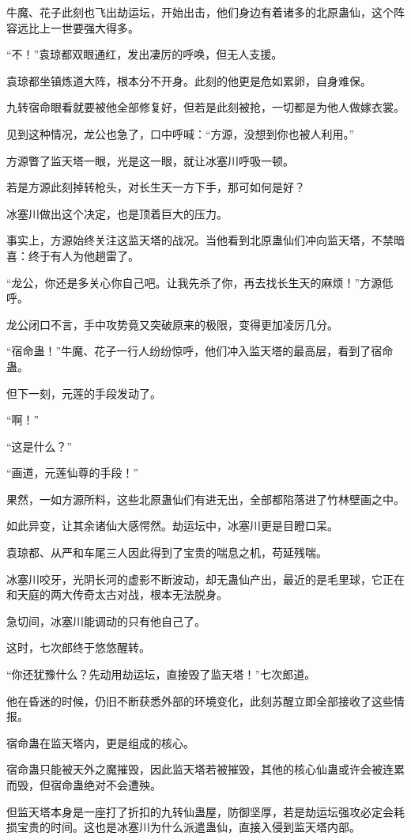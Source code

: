 \begin{this_body}
牛魔、花子此刻也飞出劫运坛，开始出击，他们身边有着诸多的北原蛊仙，这个阵容远比上一世要强大得多。

“不！”袁琼都双眼通红，发出凄厉的呼唤，但无人支援。

袁琼都坐镇炼道大阵，根本分不开身。此刻的他更是危如累卵，自身难保。

九转宿命眼看就要被他全部修复好，但若是此刻被抢，一切都是为他人做嫁衣裳。

见到这种情况，龙公也急了，口中呼喊：“方源，没想到你也被人利用。”

方源瞥了监天塔一眼，光是这一眼，就让冰塞川呼吸一顿。

若是方源此刻掉转枪头，对长生天一方下手，那可如何是好？

冰塞川做出这个决定，也是顶着巨大的压力。

事实上，方源始终关注这监天塔的战况。当他看到北原蛊仙们冲向监天塔，不禁暗喜：终于有人为他趟雷了。

“龙公，你还是多关心你自己吧。让我先杀了你，再去找长生天的麻烦！”方源低呼。

龙公闭口不言，手中攻势竟又突破原来的极限，变得更加凌厉几分。

“宿命蛊！”牛魔、花子一行人纷纷惊呼，他们冲入监天塔的最高层，看到了宿命蛊。

但下一刻，元莲的手段发动了。

“啊！”

“这是什么？”

“画道，元莲仙尊的手段！”

果然，一如方源所料，这些北原蛊仙们有进无出，全部都陷落进了竹林壁画之中。

如此异变，让其余诸仙大感愕然。劫运坛中，冰塞川更是目瞪口呆。

袁琼都、从严和车尾三人因此得到了宝贵的喘息之机，苟延残喘。

冰塞川咬牙，光阴长河的虚影不断波动，却无蛊仙产出，最近的是毛里球，它正在和天庭的两大传奇太古对战，根本无法脱身。

急切间，冰塞川能调动的只有他自己了。

这时，七次郎终于悠悠醒转。

“你还犹豫什么？先动用劫运坛，直接毁了监天塔！”七次郎道。

他在昏迷的时候，仍旧不断获悉外部的环境变化，此刻苏醒立即全部接收了这些情报。

宿命蛊在监天塔内，更是组成的核心。

宿命蛊只能被天外之魔摧毁，因此监天塔若被摧毁，其他的核心仙蛊或许会被连累而毁，但宿命蛊绝对不会遭殃。

但监天塔本身是一座打了折扣的九转仙蛊屋，防御坚厚，若是劫运坛强攻必定会耗损宝贵的时间。这也是冰塞川为什么派遣蛊仙，直接入侵到监天塔内部。


\end{this_body}
